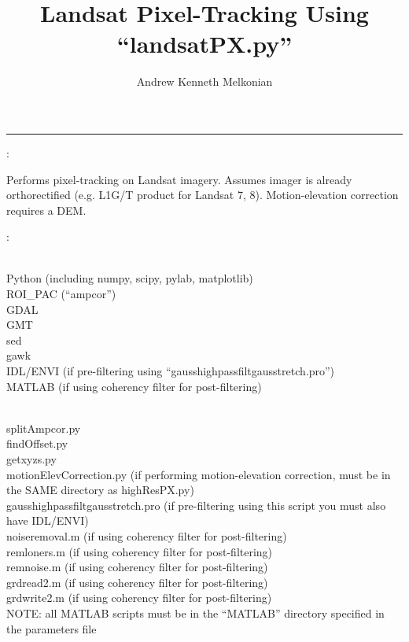 \documentclass[12pt]{article}
\title{Landsat Pixel-Tracking Using ``landsatPX.py''}
\author{Andrew Kenneth Melkonian}
\begin{document}
\maketitle

\vspace{1pt}
\hrule
\vspace{2pt}


:

Performs pixel-tracking on Landsat imagery.
Assumes imager is already orthorectified (e.g. L1G/T product for Landsat 7, 8).
Motion-elevation correction requires a DEM.

:

 \\
\indent Python (including numpy, scipy, pylab, matplotlib) \\
\indent ROI\_PAC (``ampcor'') \\
\indent GDAL \\
\indent GMT \\
\indent sed \\
\indent gawk \\
\indent IDL/ENVI (if pre-filtering using ``gausshighpassfiltgausstretch.pro'') \\
\indent MATLAB (if using coherency filter for post-filtering)

 \\
\indent splitAmpcor.py \\
\indent findOffset.py \\
\indent getxyzs.py \\
\indent motionElevCorrection.py (if performing motion-elevation correction, must be in the SAME directory as highResPX.py) \\
\indent gausshighpassfiltgausstretch.pro (if pre-filtering using this script you must also have IDL/ENVI) \\
\indent noiseremoval.m (if using coherency filter for post-filtering) \\
\indent remloners.m (if using coherency filter for post-filtering) \\
\indent remnoise.m (if using coherency filter for post-filtering) \\
\indent grdread2.m (if using coherency filter for post-filtering) \\
\indent grdwrite2.m (if using coherency filter for post-filtering) \\
\indent NOTE: all MATLAB scripts must be in the ``MATLAB'' directory specified in the parameters file
\end{document}
